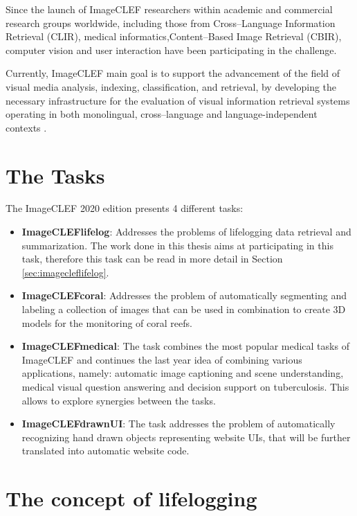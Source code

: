 Since the launch of ImageCLEF  researchers within academic and commercial research groups worldwide, including those from Cross–Language Information Retrieval (CLIR), medical informatics,Content–Based Image Retrieval (CBIR), computer vision and user interaction have been participating in the challenge. 

Currently, ImageCLEF main goal is to support the advancement of the field of visual media analysis, indexing, classification, and retrieval, by developing the necessary infrastructure for the evaluation of visual information retrieval systems operating in both monolingual, cross–language and language-independent contexts \cite{Zhang2008}. 


\newpage
\section{The Tasks}
\label{sec:tasks}

The ImageCLEF 2020 edition presents 4 different tasks:
    \begin{itemize}
    \item \textbf{ImageCLEFlifelog}: Addresses the problems of lifelogging data retrieval and summarization. The work done in this thesis aims at participating in this task, therefore this task can be read in more detail in Section \ref{sec:imagecleflifelog}.
    
    \item \textbf{ImageCLEFcoral}: Addresses the problem of automatically segmenting and labeling a collection of images that can be used in combination to create 3D models for the monitoring of coral reefs.
    
    \item \textbf{ImageCLEFmedical}: The task combines the most popular medical tasks of ImageCLEF and continues the last year idea of combining various applications, namely: automatic image captioning and scene understanding, medical visual question answering and decision support on tuberculosis. This allows to explore synergies between the tasks.
    
    \item \textbf{ImageCLEFdrawnUI}: The task addresses the problem of automatically recognizing hand drawn objects representing website UIs, that will be further translated into automatic website code.
    \end{itemize}


\section{The concept of lifelogging}
\label{sec:concept_lifelog}

